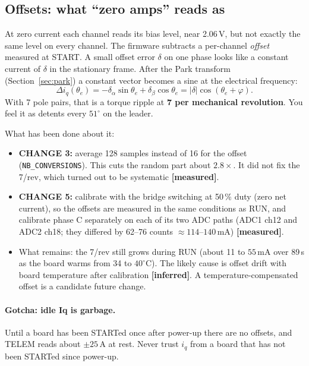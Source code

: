 \documentclass[11pt,a4paper]{article}
\newcommand{\iq}{i_q}
\newcommand{\mA}{\,\mathrm{mA}}
\newcommand{\A}{\,\mathrm{A}}
\newcommand{\file}[1]{\texttt{#1}}
\newcommand{\measured}{\textcolor{teal!70!black}{\textbf{[measured]}}}
\newcommand{\inferred}{\textcolor{orange!80!black}{\textbf{[inferred]}}}
\begin{document}
\subsection{Offsets: what ``zero amps'' reads as}
\label{sec:offset}

At zero current each channel reads its bias level, near 2.06\,V, but not
exactly the same level on every channel. The firmware subtracts a
per-channel \emph{offset} measured at START. A small offset error
$\delta$ on one phase looks like a constant current of $\delta$ in the
stationary frame. After the Park transform (Section~\ref{sec:park}) a
constant vector becomes a sine at the electrical frequency:
\begin{equation}
  \Delta\iq(\theta_e) = -\delta_\alpha \sin\theta_e + \delta_\beta\cos\theta_e
  = |\delta|\cos(\theta_e + \varphi).
\end{equation}
With 7 pole pairs, that is a torque ripple at \textbf{7 per mechanical
revolution}. You feel it as detents every $51^\circ$ on the leader.

What has been done about it:
\begin{itemize}
  \item \textbf{CHANGE 3:} average 128 samples instead of 16 for the offset
        (\file{NB\_CONVERSIONS}). This cuts the random part about
        $2.8\times$. It did not fix the 7/rev, which turned out to be
        systematic \measured.
  \item \textbf{CHANGE 5:} calibrate with the bridge switching at 50\,\%
        duty (zero net current), so the offsets are measured in the same
        conditions as RUN, and calibrate phase C separately on each of its
        two ADC paths (ADC1 ch12 and ADC2 ch18; they differed by 62--76
        counts $\approx 114$--$140\mA$) \measured.
  \item What remains: the 7/rev still grows during RUN (about 11 to
        $55\mA$ over 89\,s as the board warms from 34 to $40^\circ$C). The
        likely cause is offset drift with board temperature after
        calibration \inferred. A temperature-compensated offset is a
        candidate future change.
\end{itemize}

\paragraph{Gotcha: idle Iq is garbage.} Until a board has been STARTed
once after power-up there are no offsets, and TELEM reads about
$\pm25\A$ at rest. Never trust $\iq$ from a board that has not been
STARTed since power-up.
\end{document}
